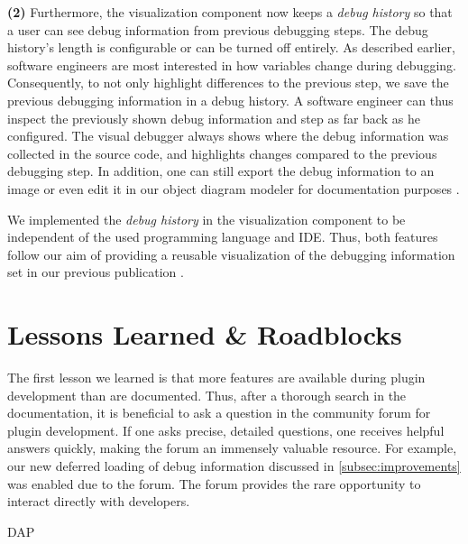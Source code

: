 \documentclass[sigconf]{acmart}
\begin{document}
\textbf{(2)} Furthermore, the visualization component now keeps a \textit{debug history} so that a user can see debug information from previous debugging steps.
The debug history's length is configurable or can be turned off entirely.
As described earlier, software engineers are most interested in how variables change during debugging.
Consequently, to not only highlight differences to the previous step, we save the previous debugging information in a debug history.
A software engineer can thus inspect the previously shown debug information and step as far back as he configured.
The visual debugger always shows where the debug information was collected in the source code, and highlights changes compared to the previous debugging step.
In addition, one can still export the debug information to an image or even edit it in our object diagram modeler \cite{timkrauterObjectdiagramjs2023} for documentation purposes \cite{krauterVisualDebuggerTool2022}.

We implemented the \textit{debug history} in the visualization component to be independent of the used programming language and IDE.
Thus, both features follow our aim of providing a reusable visualization of the debugging information set in our previous publication \cite{krauterVisualDebuggerTool2022}.

\section{Lessons Learned \& Roadblocks} \label{sec:lessonsLearned}
The first lesson we learned is that more features are available during plugin development than are documented.
Thus, after a thorough search in the documentation, it is beneficial to ask a question in the community forum for plugin development.
If one asks precise, detailed questions, one receives helpful answers quickly, making the forum an immensely valuable resource.
For example, our new deferred loading of debug information discussed in \autoref{subsec:improvements} was enabled due to the \intellij{} forum.
The forum provides the rare opportunity to interact directly with \intellij{} developers.


DAP \cite{microsoftDebugAdapterProtocol2023}
\end{document}
